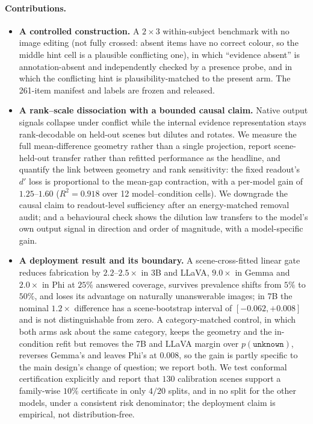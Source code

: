 \documentclass[10pt]{article}
\newcommand{\unknown}{\texttt{unknown}}
\newcommand{\punk}{p(\unknown)}
\begin{document}
\paragraph{Contributions.}
\begin{itemize}
\item \textbf{A controlled construction.} A $2\times3$ within-subject benchmark with no image editing (not fully crossed: absent items have no correct colour, so the middle hint cell is a plausible conflicting one), in which ``evidence absent'' is annotation-absent and independently checked by a presence probe, and in which the conflicting hint is plausibility-matched to the present arm. The 261-item manifest and labels are frozen and released.
\item \textbf{A rank--scale dissociation with a bounded causal claim.} Native output signals collapse under conflict while the internal evidence representation stays rank-decodable on held-out scenes but dilutes and rotates. We measure the full mean-difference geometry rather than a single projection, report scene-held-out transfer rather than refitted performance as the headline, and quantify the link between geometry and rank sensitivity: the fixed readout's $d'$ loss is proportional to the mean-gap contraction, with a per-model gain of $1.25$--$1.60$ ($R^2=0.918$ over 12 model--condition cells). We downgrade the causal claim to readout-level sufficiency after an energy-matched removal audit; and a behavioural check shows the dilution law transfers to the model's own output signal in direction and order of magnitude, with a model-specific gain.
\item \textbf{A deployment result and its boundary.} A scene-cross-fitted linear gate reduces fabrication by $2.2$--$2.5\times$ in 3B and LLaVA, $9.0\times$ in Gemma and $2.0\times$ in Phi at $25\%$ answered coverage, survives prevalence shifts from $5\%$ to $50\%$, and loses its advantage on naturally unanswerable images; in 7B the nominal $1.2\times$ difference has a scene-bootstrap interval of $[-0.062,+0.008]$ and is not distinguishable from zero. A category-matched control, in which both arms ask about the same category, keeps the geometry and the in-condition refit but removes the 7B and LLaVA margin over $\punk$, reverses Gemma's and leaves Phi's at $0.008$, so the gain is partly specific to the main design's change of question; we report both. We test conformal certification explicitly and report that $130$ calibration scenes support a family-wise $10\%$ certificate in only $4/20$ splits, and in no split for the other models, under a consistent risk denominator; the deployment claim is empirical, not distribution-free.
\end{itemize}
\end{document}
